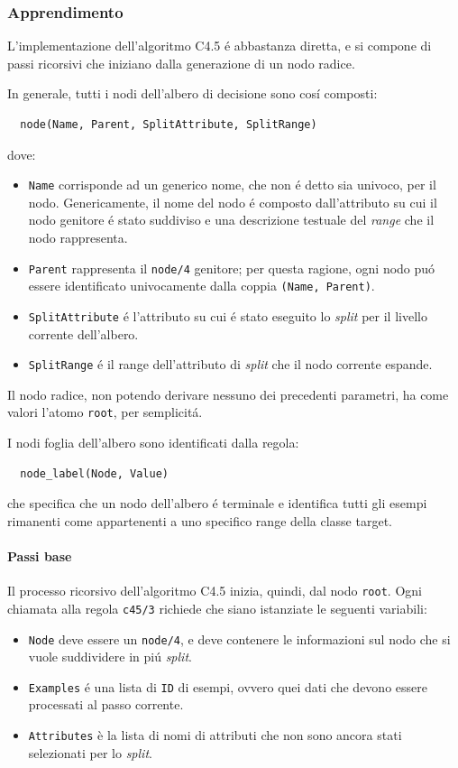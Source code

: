 \documentclass[preprint]{acm_proc_article-sp}
\begin{document}
\subsubsection{Apprendimento}
L'implementazione dell'algoritmo C4.5 \'e abbastanza diretta, e si compone di passi ricorsivi che iniziano dalla generazione di un nodo radice.

In generale, tutti i nodi dell'albero di decisione sono cos\'i composti:
\begin{verbatim}
  node(Name, Parent, SplitAttribute, SplitRange)
\end{verbatim}
dove:
\begin{itemize}
\item \verb|Name| corrisponde ad un generico nome, che non \'e detto sia univoco, per il nodo. Genericamente, il nome del nodo \'e composto dall'attributo su cui il nodo genitore \'e stato suddiviso e una descrizione testuale del \textit{range} che il nodo rappresenta.
\item \verb|Parent| rappresenta il \verb|node/4| genitore; per questa ragione, ogni nodo pu\'o essere identificato univocamente dalla coppia \verb|(Name, Parent)|.
\item \verb|SplitAttribute| \'e l'attributo su cui \'e stato eseguito lo \textit{split} per il livello corrente dell'albero.
\item \verb|SplitRange| \'e il range dell'attributo di \textit{split} che il nodo corrente espande.
\end{itemize}

Il nodo radice, non potendo derivare nessuno dei precedenti parametri, ha come valori l'atomo \verb|root|, per semplicit\'a.

I nodi foglia dell'albero sono identificati dalla regola:
\begin{verbatim}
  node_label(Node, Value)
\end{verbatim}
che specifica che un nodo dell'albero \'e terminale e identifica tutti gli esempi rimanenti come appartenenti a uno specifico range della classe target.

\paragraph{Passi base}
\label{prolog-impl-passi-base}
Il processo ricorsivo dell'algoritmo C4.5 inizia, quindi, dal nodo \verb|root|. Ogni chiamata alla regola \verb|c45/3| richiede che siano istanziate le seguenti variabili:
\begin{itemize}
\item \verb|Node| deve essere un \verb|node/4|, e deve contenere le informazioni sul nodo che si vuole suddividere in pi\'u \textit{split}.
\item \verb|Examples| \'e una lista di \verb|ID| di esempi, ovvero quei dati che devono essere processati al passo corrente.
\item \verb|Attributes| è la lista di nomi di attributi che non sono ancora stati selezionati per lo \textit{split}.
\end{itemize}
\end{document}
